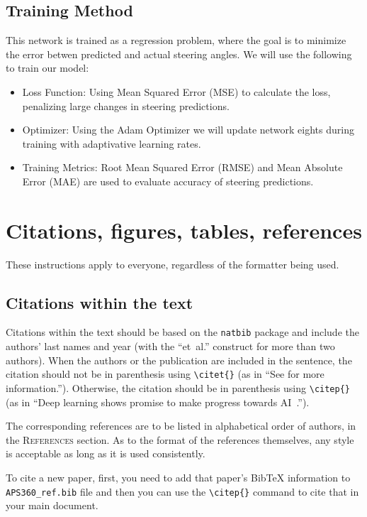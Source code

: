 \documentclass{article} %
\begin{document}
\subsection{Training Method}
This network is trained as a regression problem, where the goal is to minimize the error betwen predicted and actual
steering angles. We will use the following to train our model:
\begin{itemize}
  \item Loss Function: Using Mean Squared Error (MSE) to calculate the loss, penalizing large changes in steering
  predictions.
  \item Optimizer: Using the Adam Optimizer we will update network eights during training with adaptivative learning rates.
  \item Training Metrics: Root Mean Squared Error (RMSE) and Mean Absolute Error (MAE) are used to evaluate accuracy of steering predictions.
\end{itemize}



\section{Citations, figures, tables, references}
\label{others}

These instructions apply to everyone, regardless of the formatter being used.

\subsection{Citations within the text}

Citations within the text should be based on the \texttt{natbib} package
and include the authors' last names and year (with the ``et~al.'' construct
for more than two authors). When the authors or the publication are
included in the sentence, the citation should not be in parenthesis using \verb|\citet{}| (as
in ``See \citet{Hinton06} for more information.''). Otherwise, the citation
should be in parenthesis using \verb|\citep{}| (as in ``Deep learning shows promise to make progress
towards AI~\citep{Bengio+chapter2007}.'').

The corresponding references are to be listed in alphabetical order of
authors, in the \textsc{References} section. As to the format of the
references themselves, any style is acceptable as long as it is used
consistently.

To cite a new paper, first, you need to add that paper's BibTeX information to \verb+APS360_ref.bib+ file and then you can use the \verb|\citep{}| command to cite that in your main document. 
\end{document}
